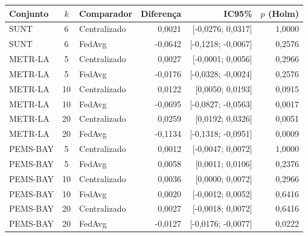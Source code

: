 \begin{tabular}{lclrrr}
\toprule
Conjunto & $k$ & Comparador & Diferença & IC95\% & $p$ (Holm) \\
\midrule
SUNT & 6 & Centralizado & 0,0021 & [-0,0276; 0,0317] & 1,0000 \\
SUNT & 6 & FedAvg & -0,0642 & [-0,1218; -0,0067] & 0,2576 \\
METR-LA & 5 & Centralizado & 0,0027 & [-0,0001; 0,0056] & 0,2966 \\
METR-LA & 5 & FedAvg & -0,0176 & [-0,0328; -0,0024] & 0,2576 \\
METR-LA & 10 & Centralizado & 0,0122 & [0,0050; 0,0193] & 0,0915 \\
METR-LA & 10 & FedAvg & -0,0695 & [-0,0827; -0,0563] & 0,0017 \\
METR-LA & 20 & Centralizado & 0,0259 & [0,0192; 0,0326] & 0,0051 \\
METR-LA & 20 & FedAvg & -0,1134 & [-0,1318; -0,0951] & 0,0009 \\
PEMS-BAY & 5 & Centralizado & 0,0012 & [-0,0047; 0,0072] & 1,0000 \\
PEMS-BAY & 5 & FedAvg & 0,0058 & [0,0011; 0,0106] & 0,2376 \\
PEMS-BAY & 10 & Centralizado & 0,0036 & [0,0000; 0,0072] & 0,2966 \\
PEMS-BAY & 10 & FedAvg & 0,0020 & [-0,0012; 0,0052] & 0,6416 \\
PEMS-BAY & 20 & Centralizado & 0,0027 & [-0,0018; 0,0072] & 0,6416 \\
PEMS-BAY & 20 & FedAvg & -0,0127 & [-0,0176; -0,0077] & 0,0222 \\
\bottomrule
\end{tabular}

